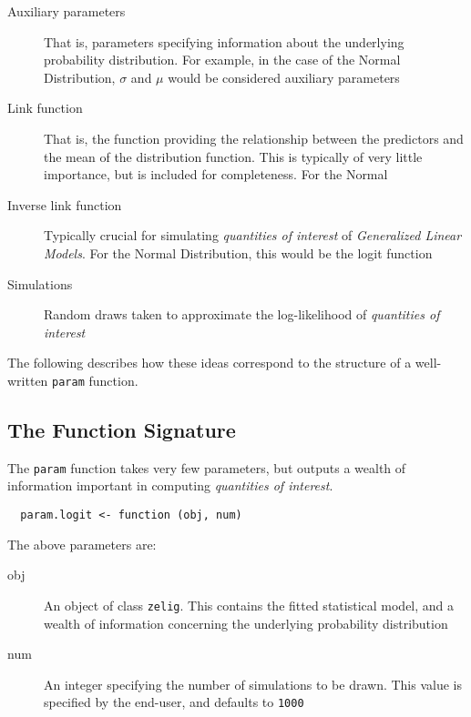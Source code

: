 \documentclass{article}
\newcommand{\code}[1]{{\tt #1}}
\begin{document}
\begin{description}

	\item[Auxiliary parameters] That is, parameters specifying information about the
		underlying probability distribution. For example, in the case of the Normal
		Distribution, $\sigma$ and $\mu$ would be considered auxiliary parameters
	
	\item[Link function] That is, the function providing the relationship between
		the predictors and the mean of the distribution function. This is typically of
		very little importance, but is included for completeness. For the Normal
	
	\item[Inverse link function] Typically crucial for simulating \emph{quantities of
		interest} of \emph{Generalized Linear Models}. For the Normal Distribution, this
		would be the logit function
	
	\item[Simulations] Random draws taken to approximate the log-likelihood of
	\emph{quantities of interest}

\end{description}

The following describes how these ideas correspond to the structure of a well-written
\code{param} function.

\subsection{The Function Signature}

The \code{param} function takes very few parameters, but outputs a wealth of information
important in computing \emph{quantities of interest}.

\begin{verbatim}
  param.logit <- function (obj, num)
\end{verbatim}

\noindent The above parameters are:

\begin{description}

	\item[obj] An object of class \code{zelig}. This contains the fitted statistical model,
		and a wealth of information concerning the underlying probability distribution
	
	\item[num] An integer specifying the number of simulations to be drawn. This value is
		specified by the end-user, and defaults to \code{1000}

\end{description}
\end{document}
